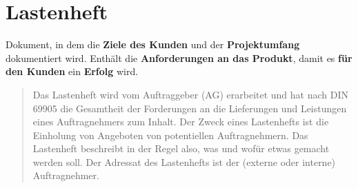 \section{Lastenheft}

\begin{tcolorbox}[title=Lastenheft]

    Dokument, in dem die \textbf{Ziele des Kunden} und der \textbf{Projektumfang} dokumentiert wird.
    Enthält die \textbf{Anforderungen an das Produkt}, damit es \textbf{für den Kunden} ein \textbf{Erfolg} wird.\\

    \blockquote[{\cite[305]{AABG14m}}]{
        Das Lastenheft wird vom Auftraggeber (AG) erarbeitet und hat
        nach DIN 69905 die Gesamtheit der Forderungen an die Lieferungen und Leistungen eines Auftragnehmers zum Inhalt. Der Zweck eines Lastenhefts ist die Einholung von Angeboten von potentiellen Auftragnehmern. Das Lastenheft beschreibt
        in der Regel also, was und wofür etwas gemacht werden soll. Der Adressat des
        Lastenhefts ist der (externe oder interne) Auftragnehmer.
    }
\end{tcolorbox}

